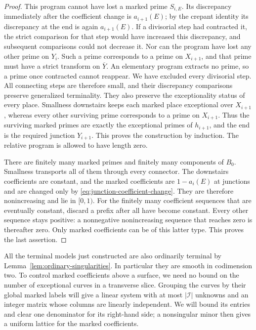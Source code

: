 \begin{proof}
This program cannot have lost a marked prime $S_{i,E}$.  Its discrepancy
immediately after the coefficient change is $a_{i+1}(E)$; by the crepant
identity its discrepancy at the end is again $a_{i+1}(E)$.  If a divisorial
step had contracted it, the strict comparison for that step would have
increased this discrepancy, and subsequent comparisons could not decrease
it.  Nor can the program have lost any other prime on $Y_i$.  Such a prime
corresponds to a prime on $X_{i+1}$, and that prime must have a strict
transform on $\overline Y$.  An elementary program extracts no prime, so a
prime once contracted cannot reappear.  We have excluded every divisorial
step.  All connecting steps are therefore small, and their discrepancy
comparisons preserve generalized terminality.  They also preserve the
exceptionality status of every place.  Smallness downstairs keeps each
marked place exceptional over $X_{i+1}$, whereas every other surviving
prime corresponds to a prime on $X_{i+1}$.  Thus the surviving marked
primes are exactly the exceptional primes of $h_{i+1}$, and the end is the
required junction $Y_{i+1}$.  This proves the construction by induction.  The
relative program is allowed to have length zero.

There are finitely many marked primes and finitely many components of
$B_0$.  Smallness transports all of them through every connector.  The
downstairs coefficients are constant, and the marked coefficients are
$1-a_i(E)$ at junctions and are changed only by
\eqref{eq:junction-coefficient-change}.  They are therefore nonincreasing
and lie in $[0,1)$.  For the finitely many coefficient sequences that are
eventually constant, discard a prefix after all have become constant.
Every other sequence stays positive: a nonnegative nonincreasing sequence
that reaches zero is thereafter zero.  Only marked coefficients can be of
this latter type.  This proves the last assertion.
\end{proof}

All the terminal models just constructed are also ordinarily terminal by
Lemma~\ref{lem:ordinary-singularities}.  In particular they are smooth in
codimension two.  To control marked coefficients above a surface, we need
no bound on the number of exceptional curves in a transverse slice.
Grouping the curves by their global marked labels will give a linear
system with at most $|\mathcal I|$ unknowns and an integer matrix whose
columns are linearly independent.  We will bound its entries and clear one denominator for
its right-hand side; a nonsingular minor then gives a uniform lattice for
the marked coefficients.

